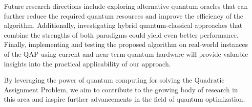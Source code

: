 Future research directions include exploring alternative quantum oracles that can further reduce the required quantum resources and improve the efficiency of the algorithm. Additionally, investigating hybrid quantum-classical approaches that combine the strengths of both paradigms could yield even better performance. Finally, implementing and testing the proposed algorithm on real-world instances of the QAP using current and near-term quantum hardware will provide valuable insights into the practical applicability of our approach.

By leveraging the power of quantum computing for solving the Quadratic Assignment Problem, we aim to contribute to the growing body of research in this area and inspire further advancements in the field of quantum optimization.

